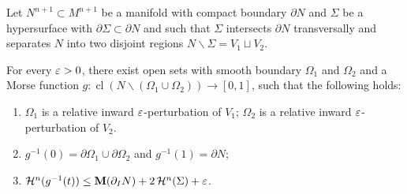 \begin{lemma}\label{lem:morse-separate}
    Let $N^{n + 1}\subset M^{n + 1}$ be a manifold with compact boundary $\partial N$ and $\Sigma$ be a hypersurface with $\partial\Sigma \subset \partial N$ and such that $\Sigma$ intersects $\partial N$ transversally and separates $N$ into two disjoint regions $N\backslash \Sigma = V_1 \sqcup V_2$.

    For every $\varepsilon > 0$, there exist open sets with smooth boundary $\Omega_1$ and $\Omega_2$ and a Morse function $g: \operatorname{cl}(N\backslash(\Omega_1\cup\Omega_2)) \to [0, 1]$, such that the following holds:
    \begin{enumerate}
        \item[(1)] $\Omega_1$ is a relative inward $\varepsilon$-perturbation of $V_1$; $\Omega_2$ is a relative inward $\varepsilon$-perturbation of $V_2$.
        \item[(2)] $g^{-1}(0) = \partial\Omega_1\cup\partial\Omega_2$ and $g^{-1}(1) = \partial N$;
        \item[(3)] $\mathcal{H}^n(g^{-1}(t)) \leq \mathbf{M}(\partial_I N) + 2\,\mathcal{H}^n(\Sigma) + \varepsilon$.
    \end{enumerate}
\end{lemma}
